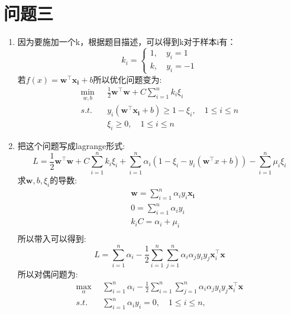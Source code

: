 \documentclass[answers]{exam}  %
\begin{document}
\section{问题三}
\begin{enumerate}[label=\alph*.] 
    \item 因为要施加一个k，根据题目描述，可以得到k对于样本i有：
    \begin{equation*}
        k_i = \begin{cases*}
             1,\quad y_i = 1 \\
             k,\quad y_i = -1 
        \end{cases*}
    \end{equation*}
    若$f(x) = \mathbf{w}^\top \mathbf{x_i}+ b$所以优化问题变为:
    \begin{align*}
        \min_{w,b} & \frac{1}{2}\mathbf{w}^\top \mathbf{w} + C \sum_{i=1}^{n} k_i \xi_i  \\
        s.t.\quad  & y_i(\mathbf{w}^\top \mathbf{x_i} + b) \geq 1 - \xi_i, \quad 1\leq i \leq n \\
                   & \xi_i \geq 0,\quad 1\leq i \leq n
    \end{align*}
    \item 把这个问题写成lagrange形式:
    \begin{equation*}
        L = \frac{1}{2}\mathbf{w}^\top \mathbf{w} +  C \sum_{i=1}^{n} k_i \xi_i + \sum_{i=1}^{n}\alpha_i (1 - \xi_i - y_i(\mathbf{w}^\top x + b)) - \sum_{i=1}^{n}\mu_i \xi_i
    \end{equation*}
    求$\mathbf{w},b,\xi_i$的导数:
    \begin{align*}
        & \mathbf{w} = \sum_{i=1}^{n} \alpha_i y_i \mathbf{x_i}\\
        & 0 = \sum_{i=1}^{n} \alpha_i y_i \\
        & k_i C = \alpha_i + \mu_i \\
    \end{align*}
    所以带入可以得到:
    \begin{equation*}
        L = \sum_{i=1}^{n} \alpha_i - \frac{1}{2}\sum_{i=1}^{n}\sum_{j=1}^{n}\alpha_i \alpha_jy_i y_j \mathbf{x}_i^\top \mathbf{x}
    \end{equation*}
    所以对偶问题为:
    \begin{align*}
        \max_\alpha & \sum_{i=1}^{n} \alpha_i - \frac{1}{2}\sum_{i=1}^{n}\sum_{j=1}^{n}\alpha_i \alpha_jy_i y_j \mathbf{x}_i^\top \mathbf{x}\\
        s.t. \quad  & \sum_{i=1}^{n} \alpha_i y_i= 0,\quad 1\leq i\leq n,\\

\end{align*}
\end{enumerate}
\end{document}
